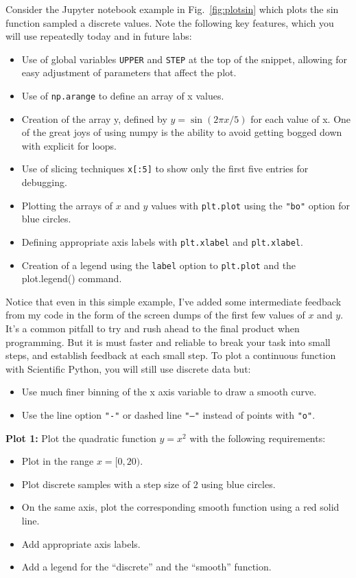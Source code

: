 Consider the Jupyter notebook example in Fig.~\ref{fig:plotsin} which plots the sin function sampled a discrete values.  Note the following key features, which you will use repeatedly today and in future labs:
\begin{itemize}
\item Use of global variables {\tt UPPER} and {\tt STEP} at the top of the snippet, allowing for easy adjustment of parameters that affect the plot.
\item Use of {\tt np.arange} to define an array of x values.
\item Creation of the array y, defined by $y = \sin(2\pi x / 5)$ for each value of x.  One of the great joys of using numpy is the ability to avoid getting bogged down with explicit for loops.
\item Use of slicing techniques {\tt x[:5]} to show only the first five entries for debugging.  
\item Plotting the arrays of $x$ and $y$ values with {\tt plt.plot}  using the {\tt "bo"} option for blue circles.
\item Defining appropriate axis labels with {\tt plt.xlabel} and {\tt plt.xlabel}. 
\item Creation of a legend using the {\tt label} option to {\tt plt.plot} and the {plot.legend()} command.
\end{itemize}
Notice that even in this simple example, I've added some intermediate feedback from my code in the form of the screen dumps of the first few values of $x$ and $y$.  It's a common pitfall to try and rush ahead to the final product when programming.  But it is must faster and reliable to break your task into small steps, and establish feedback at each small step. 
	To plot a continuous function with Scientific Python, you will still use discrete data but:
\begin{itemize}
 \item Use much finer binning of the x axis variable to draw a smooth curve. 
 \item Use the line option {\tt "-"} or dashed line {\tt "--"} instead of points with {\tt "o"}. 
\end{itemize} 

{\bf Plot 1:}  Plot the quadratic function $y = x^2$ with the following requirements:
\begin{itemize}
 \item Plot in the range $x = [0,20)$.
 \item Plot discrete samples with a step size of $2$ using blue circles.
 \item On the same axis, plot the corresponding smooth function using a red solid line.
 \item Add appropriate axis labels. 
 \item Add a legend for the ``discrete'' and the ``smooth''  function.
\end{itemize}

